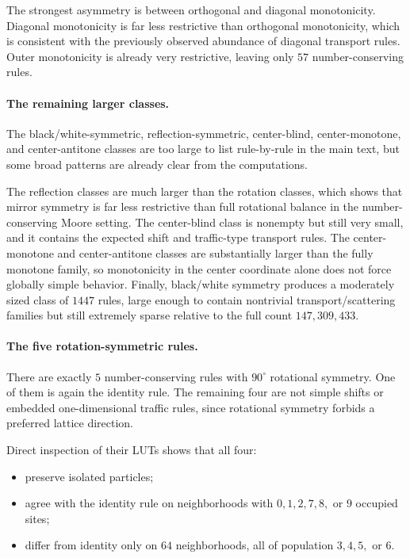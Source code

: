 \documentclass[11pt,a4paper]{article}
\begin{document}
The strongest asymmetry is between orthogonal and diagonal monotonicity.  Diagonal monotonicity
is far less restrictive than orthogonal monotonicity, which is consistent with the previously
observed abundance of diagonal transport rules.  Outer monotonicity is already very restrictive,
leaving only \(57\) number-conserving rules.

\paragraph{The remaining larger classes.}
The black/white-symmetric, reflection-symmetric, center-blind, center-monotone, and
center-antitone classes are too large to list rule-by-rule in the main text, but some broad
patterns are already clear from the computations.

The reflection classes are much larger than the rotation classes, which shows that mirror
symmetry is far less restrictive than full rotational balance in the number-conserving Moore
setting.  The center-blind class is nonempty but still very small, and it contains the expected
shift and traffic-type transport rules.  The center-monotone and center-antitone classes are
substantially larger than the fully monotone family, so monotonicity in the center coordinate
alone does not force globally simple behavior.  Finally, black/white symmetry produces a
moderately sized class of \(1447\) rules, large enough to contain nontrivial transport/scattering
families but still extremely sparse relative to the full count \(147{,}309{,}433\).

\paragraph{The five rotation-symmetric rules.}
There are exactly \(5\) number-conserving rules with \(90^\circ\) rotational symmetry.  One of
them is again the identity rule.  The remaining four are not simple shifts or embedded
one-dimensional traffic rules, since rotational symmetry forbids a preferred lattice direction.

Direct inspection of their LUTs shows that all four:
\begin{itemize}
\item preserve isolated particles;
\item agree with the identity rule on neighborhoods with \(0,1,2,7,8,\) or \(9\) occupied sites;
\item differ from identity only on \(64\) neighborhoods, all of population \(3,4,5,\) or \(6\).
\end{itemize}
\end{document}
